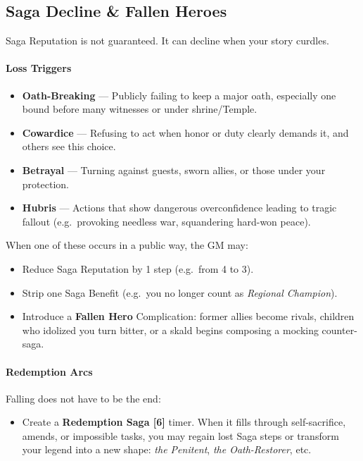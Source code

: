 \documentclass[11pt]{article}
\begin{document}
\subsection{Saga Decline \& Fallen Heroes}

Saga Reputation is not guaranteed. It can decline when your story curdles.

\paragraph*{Loss Triggers}
\begin{itemize}
  \item \textbf{Oath-Breaking} --- Publicly failing to keep a major oath, especially one bound
        before many witnesses or under shrine/Temple.
  \item \textbf{Cowardice} --- Refusing to act when honor or duty clearly demands it, and others
        see this choice.
  \item \textbf{Betrayal} --- Turning against guests, sworn allies, or those under your protection.
  \item \textbf{Hubris} --- Actions that show dangerous overconfidence leading to tragic fallout
        (e.g.\ provoking needless war, squandering hard-won peace).
\end{itemize}

When one of these occurs in a public way, the GM may:
\begin{itemize}
  \item Reduce Saga Reputation by 1 step (e.g.\ from 4 to 3).
  \item Strip one Saga Benefit (e.g.\ you no longer count as \emph{Regional Champion}).
  \item Introduce a \textbf{Fallen Hero} Complication: former allies become rivals, children who
        idolized you turn bitter, or a skald begins composing a mocking counter-saga.
\end{itemize}

\paragraph*{Redemption Arcs}
Falling does not have to be the end:
\begin{itemize}
  \item Create a \textbf{Redemption Saga [6]} timer. When it fills through self-sacrifice,
        amends, or impossible tasks, you may regain lost Saga steps or transform your legend into
        a new shape: \emph{the Penitent}, \emph{the Oath-Restorer}, etc.
\end{itemize}
\end{document}
